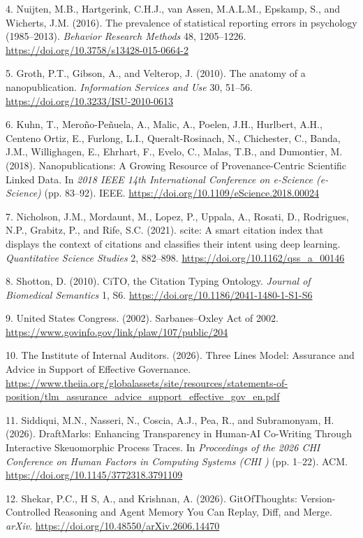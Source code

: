 \documentclass[
  english,
]{article}
\begin{document}
{4.} Nuijten, M.B., Hartgerink, C.H.J., van Assen, M.A.L.M., Epskamp, S., and Wicherts, J.M. (2016). The prevalence of statistical reporting errors in psychology (1985--2013). \emph{Behavior Research Methods} 48, 1205--1226. \url{https://doi.org/10.3758/s13428-015-0664-2}

{5.} Groth, P.T., Gibson, A., and Velterop, J. (2010). The anatomy of a nanopublication. \emph{Information Services and Use} 30, 51--56. \url{https://doi.org/10.3233/ISU-2010-0613}

{6.} Kuhn, T., Meroño-Peñuela, A., Malic, A., Poelen, J.H., Hurlbert, A.H., Centeno Ortiz, E., Furlong, L.I., Queralt-Rosinach, N., Chichester, C., Banda, J.M., Willighagen, E., Ehrhart, F., Evelo, C., Malas, T.B., and Dumontier, M. (2018). Nanopublications: A Growing Resource of Provenance-Centric Scientific Linked Data. In \emph{2018 IEEE 14th International Conference on e-Science (e-Science)} (pp. 83--92). IEEE. \url{https://doi.org/10.1109/eScience.2018.00024}

{7.} Nicholson, J.M., Mordaunt, M., Lopez, P., Uppala, A., Rosati, D., Rodrigues, N.P., Grabitz, P., and Rife, S.C. (2021). scite: A smart citation index that displays the context of citations and classifies their intent using deep learning. \emph{Quantitative Science Studies} 2, 882--898. \url{https://doi.org/10.1162/qss_a_00146}

{8.} Shotton, D. (2010). CiTO, the Citation Typing Ontology. \emph{Journal of Biomedical Semantics} 1, S6. \url{https://doi.org/10.1186/2041-1480-1-S1-S6}

{9.} United States Congress. (2002). Sarbanes--Oxley Act of 2002. \url{https://www.govinfo.gov/link/plaw/107/public/204}

{10.} The Institute of Internal Auditors. (2026). Three Lines Model: Assurance and Advice in Support of Effective Governance. \url{https://www.theiia.org/globalassets/site/resources/statements-of-position/tlm_assurance_advice_support_effective_gov_en.pdf}

{11.} Siddiqui, M.N., Nasseri, N., Coscia, A.J., Pea, R., and Subramonyam, H. (2026). DraftMarks: Enhancing Transparency in Human-AI Co-Writing Through Interactive Skeuomorphic Process Traces. In \emph{Proceedings of the 2026 CHI Conference on Human Factors in Computing Systems (CHI )} (pp. 1--22). ACM. \url{https://doi.org/10.1145/3772318.3791109}

{12.} Shekar, P.C., H S, A., and Krishnan, A. (2026). GitOfThoughts: Version-Controlled Reasoning and Agent Memory You Can Replay, Diff, and Merge. \emph{arXiv}. \url{https://doi.org/10.48550/arXiv.2606.14470}
\end{document}
